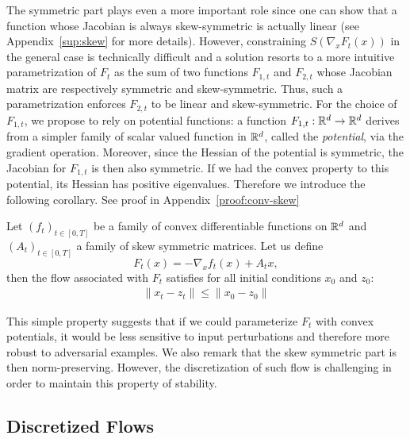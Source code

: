 The symmetric part plays even a more important role since one can show that a function whose Jacobian is always skew-symmetric is actually linear (see Appendix~\ref{sup:skew} for more details). However, constraining $S(\nabla_x F_{t}(x))$ in the general case is technically difficult and a solution resorts to a more intuitive parametrization of  $F_t$ as the sum of two functions $F_{1,t}$ and $F_{2,t}$ whose Jacobian matrix are respectively symmetric  and skew-symmetric.  Thus, such a parametrization enforces $F_{2,t}$  to be linear and skew-symmetric. For the choice of $F_{1,t}$, we propose to rely on potential functions: a function  $F_{1,t}:\mathbb{R}^d \to \mathbb{R}^d$ derives from a simpler family of scalar valued function in $\mathbb{R}^d$, called the \emph{potential}, via the gradient operation. Moreover, since the Hessian of the potential is symmetric, the Jacobian for $F_{1,t}$ is then also symmetric.  If we had the convex property to this potential, its Hessian has positive eigenvalues. Therefore we introduce the following corollary. See proof in Appendix~\ref{proof:conv-skew} 

\begin{corollary} 
\label{cor:conv-skew}Let $(f_{t})_{t\in[0,T]}$ be a family of convex differentiable functions on $\mathbb{R}^d$ and $(A_t)_{t\in[0,T]}$ a family of skew symmetric matrices. Let us define 
$$F_t(x) = -\nabla_x f_{t}(x)+A_t x,$$ 
then the flow associated with $F_t$ satisfies for all initial conditions $x_0$ and $z_0$:
\begin{align*}
\lVert x_t-z_t \rVert\leq \lVert x_0-z_0 \rVert
\end{align*}
\end{corollary}

This simple property suggests that if we could parameterize $F_t$  with convex potentials, it would be less sensitive to input perturbations and therefore more robust to adversarial examples. We also remark that the skew symmetric part is then norm-preserving.
However, the discretization of such flow is challenging in order to maintain this property of stability. 


\subsection{Discretized Flows}

